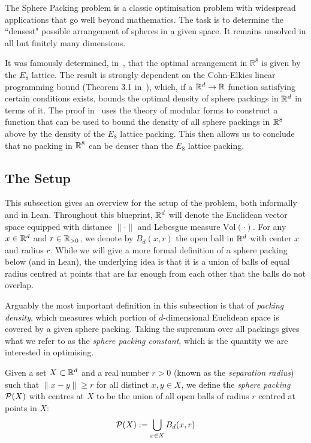 The Sphere Packing problem is a classic optimisation problem with widespread applications that go well beyond mathematics. The task is to determine the ``densest" possible arrangement of spheres in a given space. It remains unsolved in all but finitely many dimensions.

It was famously determined, in~\cite{Via2017}, that the optimal arrangement in $\mathbb{R}^8$ is given by the $E_8$ lattice. The result is strongly dependent on the Cohn-Elkies linear programming bound (Theorem 3.1 in~\cite{ElkiesCohn}), which, if a $\mathbb{R}^d \to \mathbb{R}$ function satisfying certain conditions exists, bounds the optimal density of sphere packings in $\mathbb{R}^d$ in terms of it. The proof in~\cite{Via2017} uses the theory of modular forms to construct a function that can be used to bound the density of all sphere packings in $\mathbb{R}^8$ above by the density of the $E_8$ lattice packing. This then allows us to conclude that no packing in $\mathbb{R}^8$ can be denser than the $E_8$ lattice packing.

\subsection{The Setup}

This subsection gives an overview for the setup of the problem, both informally and in Lean. Throughout this blueprint, $\mathbb{R}^d$ will denote the Euclidean vector space equipped with distance $\|\cdot\|$ and Lebesgue measure $\mathrm{Vol}(\cdot)$. For any $x\in\mathbb{R}^d$ and $r\in\mathbb{R}_{>0}$, we denote by $B_d(x,r)$ the open ball in $\mathbb{R}^d$ with center $x$ and radius $r$. While we will give a more formal definition of a sphere packing below (and in Lean), the underlying idea is that it is a union of balls of equal radius centred at points that are far enough from each other that the balls do not overlap.

Arguably the most important definition in this subsection is that of \emph{packing density}, which measures which portion of $d$-dimensional Euclidean space is covered by a given sphere packing. Taking the supremum over all packings gives what we refer to as the \emph{sphere packing constant}, which is the quantity we are interested in optimising.

\begin{definition}\label{SpherePacking.balls}\leanok  %
  Given a set $X \subset \mathbb{R}^d$ and a real number $r > 0$ (known as the \emph{separation radius}) such that $\|x - y\| \geq r$ for all distinct $x, y \in X$, we define the \emph{sphere packing} $\mathcal{P}(X)$ with centres at $X$ to be the union of all open balls of radius $r$ centred at points in $X$:
  \[
    \mathcal{P}(X) := \bigcup_{x \in X} B_d(x, r)
  \]
\end{definition}

